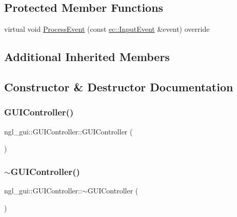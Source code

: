 \subsection*{Protected Member Functions}
\begin{DoxyCompactItemize}
\item 
virtual void \mbox{\hyperlink{classngl__gui_1_1_g_u_i_controller_aa0f7e017d386e1e2f02359916be51137}{Process\+Event}} (const \mbox{\hyperlink{structec_1_1_input_event}{ec\+::\+Input\+Event}} \&event) override
\end{DoxyCompactItemize}
\subsection*{Additional Inherited Members}


\subsection{Constructor \& Destructor Documentation}
\mbox{\label{classngl__gui_1_1_g_u_i_controller_ac6fe96782bdf72d10859c0a68caf411c}} 
\subsubsection{\texorpdfstring{G\+U\+I\+Controller()}{GUIController()}}
{\footnotesize\ttfamily ngl\+\_\+gui\+::\+G\+U\+I\+Controller\+::\+G\+U\+I\+Controller (\begin{DoxyParamCaption}{ }\end{DoxyParamCaption})\hspace{0.3cm}{\ttfamily [explicit]}}

\mbox{\label{classngl__gui_1_1_g_u_i_controller_a729c3ba7e7932d954db59172f435e745}} 
\subsubsection{\texorpdfstring{$\sim$\+G\+U\+I\+Controller()}{~GUIController()}}
{\footnotesize\ttfamily ngl\+\_\+gui\+::\+G\+U\+I\+Controller\+::$\sim$\+G\+U\+I\+Controller (\begin{DoxyParamCaption}{ }\end{DoxyParamCaption})}




